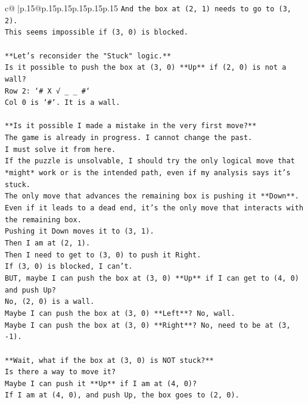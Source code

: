 \documentclass{article}
\begin{document}
{\begin{supertabular}{c@{$\;$}|p{.15\linewidth}@{}p{.15\linewidth}p{.15\linewidth}p{.15\linewidth}p{.15\linewidth}p{.15\linewidth}}
{{{\texttt{And the box at (2, 1) needs to go to (3, 2).} \\
\texttt{This seems impossible if (3, 0) is blocked.} \\
\\ 
\texttt{**Let's reconsider the "Stuck" logic.**} \\
\texttt{Is it possible to push the box at (3, 0) **Up** if (2, 0) is not a wall?} \\
\texttt{Row 2: `\# X √ \_ \_ \#`} \\
\texttt{Col 0 is `\#`. It is a wall.} \\
\\ 
\texttt{**Is it possible I made a mistake in the very first move?**} \\
\texttt{The game is already in progress. I cannot change the past.} \\
\texttt{I must solve it from here.} \\
\texttt{If the puzzle is unsolvable, I should try the only logical move that *might* work or is the intended path, even if my analysis says it's stuck.} \\
\texttt{The only move that advances the remaining box is pushing it **Down**.} \\
\texttt{Even if it leads to a dead end, it's the only move that interacts with the remaining box.} \\
\texttt{Pushing it Down moves it to (3, 1).} \\
\texttt{Then I am at (2, 1).} \\
\texttt{Then I need to get to (3, 0) to push it Right.} \\
\texttt{If (3, 0) is blocked, I can't.} \\
\texttt{BUT, maybe I can push the box at (3, 0) **Up** if I can get to (4, 0) and push Up?} \\
\texttt{No, (2, 0) is a wall.} \\
\texttt{Maybe I can push the box at (3, 0) **Left**? No, wall.} \\
\texttt{Maybe I can push the box at (3, 0) **Right**? No, need to be at (3, {-}1).} \\
\\ 
\texttt{**Wait, what if the box at (3, 0) is NOT stuck?**} \\
\texttt{Is there a way to move it?} \\
\texttt{Maybe I can push it **Up** if I am at (4, 0)?} \\
\texttt{If I am at (4, 0), and push Up, the box goes to (2, 0).} \\
}}}
\end{supertabular}}
\end{document}
